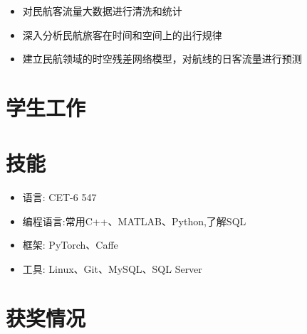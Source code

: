 \documentclass{resume}
\begin{document}
\begin{itemize}[topsep = 0 pt, partopsep = 0pt]
  \item 对民航客流量大数据进行清洗和统计
  \item 深入分析民航旅客在时间和空间上的出行规律
  \item 建立民航领域的时空残差网络模型，对航线的日客流量进行预测
\end{itemize}



\section{学生工作}

\section{技能}
\begin{itemize}[parsep=0.5ex]
  \item 语言: CET-6 547
  \item 编程语言:常用C++、MATLAB、Python,了解SQL
  \item 框架: PyTorch、Caffe
  \item 工具: Linux、Git、MySQL、SQL Server
\end{itemize}

\section{获奖情况}

\end{document}
